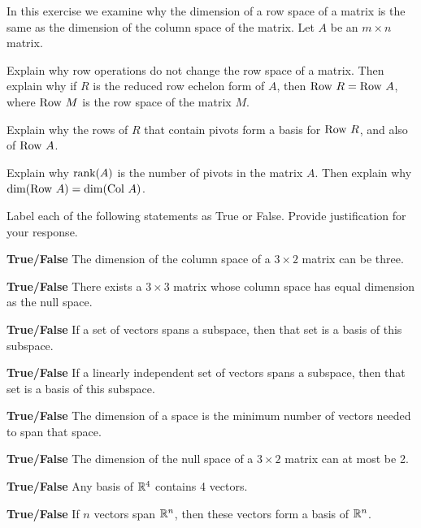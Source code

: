 	\ea

\item In this exercise we examine why the dimension of a row space of a matrix is the same as the dimension of the column space of the matrix. Let $A$ be an $m \times n$ matrix. 
	\ba
	\item Explain why row operations do not change the row space of a matrix. Then explain why if $R$ is the reduced row echelon form of $A$, then $\text{Row } R = \text{Row } A$, where $\text{Row } M$ is the row space of the matrix $M$. 
	
	\item Explain why the rows of $R$ that contain pivots form a basis for $\text{Row } R$, and also of $\text{Row } A$. 
	
	\item Explain why $\text{rank}(A)$ is the number of pivots in the matrix $A$. Then explain why $\dim(\text{Row } A) = \dim(\text{Col } A)$. 
	
	\ea
	
\item Label each of the following statements as True or False. Provide justification for your response.
\ba
\item \textbf{True/False} The dimension of the column space of a $3\times 2$ matrix can be three.

\item \textbf{True/False} There exists a $3\times 3$ matrix whose column space has equal dimension as the null space.

\item \textbf{True/False} If a set of vectors spans a subspace, then that set is a basis of this subspace.

\item \textbf{True/False} If a linearly independent set of vectors spans a subspace, then that set is a basis of this subspace. 

\item \textbf{True/False} The dimension of a space is the minimum number of vectors needed to span that space.

\item \textbf{True/False} The dimension of the null space of a $3\times 2$ matrix can at most be 2.

\item \textbf{True/False} Any basis of $\mathbb{R}^4$ contains 4 vectors.

\item \textbf{True/False} If $n$ vectors span $\mathbb{R}^n$, then these vectors form a basis of $\mathbb{R}^n$.

